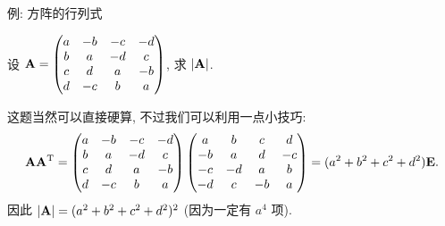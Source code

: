 \begin{frame}{例: 方阵的行列式}
	\onslide<+->
	\begin{example}
		设 ${\mathbf{A}}=\begin{pmatrix}
			a&-b&-c&-d\\
			b&a&-d&c\\
			c&d&a&-b\\
			d&-c&b&a
		\end{pmatrix}$, 求 $|{\mathbf{A}}|$.
	\end{example}
	\onslide<+->
	这题当然可以直接硬算, 不过我们可以利用一点小技巧:
	\[{\mathbf{A}}{\mathbf{A}}^{\mathrm{T}}=\begin{pmatrix}
		a&-b&-c&-d\\
		b&a&-d&c\\
		c&d&a&-b\\
		d&-c&b&a
	\end{pmatrix}\begin{pmatrix}
		a&b&c&d\\
		-b&a&d&-c\\
		-c&-d&a&b\\
		-d&c&-b&a
	\end{pmatrix}=(a^2+b^2+c^2+d^2){\mathbf{E}}.\]
	\onslide<+->
	因此 $|{\mathbf{A}}|=(a^2+b^2+c^2+d^2)^2$ (因为一定有 $a^4$ 项).
\end{frame}


